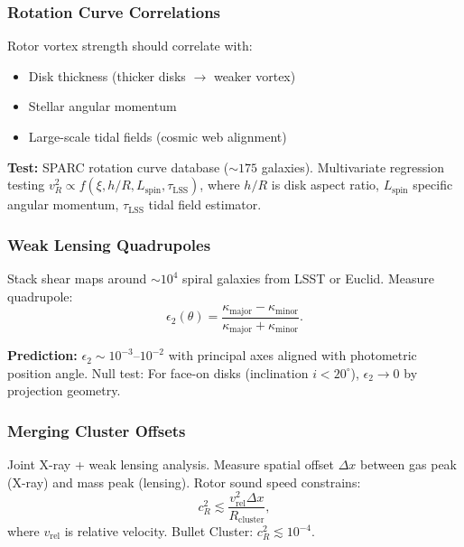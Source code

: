 \documentclass[11pt,a4paper]{article}
\numberwithin{equation}{section}
\theoremstyle{plain}
\theoremstyle{definition}
\theoremstyle{remark}
\begin{document}
\subsubsection{Rotation Curve Correlations}

Rotor vortex strength should correlate with:
\begin{itemize}
\item Disk thickness (thicker disks $\to$ weaker vortex)
\item Stellar angular momentum
\item Large-scale tidal fields (cosmic web alignment)
\end{itemize}

\textbf{Test:} SPARC rotation curve database ($\sim 175$ galaxies). Multivariate regression testing $v_R^2 \propto f(\xi, h/R, L_{\mathrm{spin}}, \tau_{\mathrm{LSS}})$, where $h/R$ is disk aspect ratio, $L_{\mathrm{spin}}$ specific angular momentum, $\tau_{\mathrm{LSS}}$ tidal field estimator.

\subsubsection{Weak Lensing Quadrupoles}

Stack shear maps around $\sim 10^4$ spiral galaxies from LSST or Euclid. Measure quadrupole:
\begin{equation}
\epsilon_2(\theta) = \frac{\kappa_{\mathrm{major}} - \kappa_{\mathrm{minor}}}{\kappa_{\mathrm{major}} + \kappa_{\mathrm{minor}}}.
\end{equation}

\textbf{Prediction:} $\epsilon_2 \sim 10^{-3}$–$10^{-2}$ with principal axes aligned with photometric position angle. Null test: For face-on disks (inclination $i < 20^\circ$), $\epsilon_2 \to 0$ by projection geometry.

\subsubsection{Merging Cluster Offsets}

Joint X-ray + weak lensing analysis. Measure spatial offset $\Delta x$ between gas peak (X-ray) and mass peak (lensing). Rotor sound speed constrains:
\begin{equation}
c_R^2 \lesssim \frac{v_{\mathrm{rel}}^2 \Delta x}{R_{\mathrm{cluster}}},
\end{equation}
where $v_{\mathrm{rel}}$ is relative velocity. Bullet Cluster: $c_R^2 \lesssim 10^{-4}$.
\end{document}
